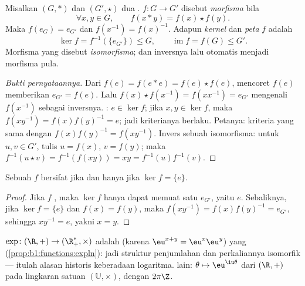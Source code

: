 \begin{definition}\label{def:b1:structures:morphism}
Misalkan $(G, *)$ dan $(G', \star)$ dua .  $f \colon G \to G'$
disebut \emph{morfisma} bila
\[
\forall x, y \in G, \qquad f(x * y) = f(x) \star f(y).
\]
Maka $f(e_G) = e_{G'}$ dan $f(x^{-1}) = f(x)^{-1}$. Adapun
\emph{kernel} dan \emph{peta} $f$ adalah
\[
\ker f = f^{-1}(\{e_{G'}\}) \leq G,
\qquad
\operatorname{im} f = f(G) \leq G' .
\]
Morfisma yang  disebut \emph{isomorfisma}; dan  inversnya lalu
otomatis menjadi morfisma pula.
\end{definition}

\begin{proof}[Bukti pernyataannya]
Dari $f(e) = f(e * e) = f(e)\star f(e)$, mencoret $f(e)$ memberikan
$e_{G'} = f(e)$. Lalu $f(x)\star f(x^{-1}) = f(x x^{-1}) = e_{G'}$
mengenali $f(x^{-1})$ sebagai inversnya. : $e \in \ker f$; jika
$x, y \in \ker f$, maka $f(xy^{-1}) = f(x)f(y)^{-1} = e$; jadi kriterianya
berlaku. Petanya: kriteria yang sama dengan $f(x)f(y)^{-1} = f(xy^{-1})$.
Invers sebuah isomorfisma: untuk $u, v \in G'$, tulis $u = f(x)$, $v =
f(y)$; maka $f^{-1}(u \star v) = f^{-1}(f(xy)) = xy =
f^{-1}(u) f^{-1}(v)$.
\end{proof}

\begin{proposition}\label{prop:b1:structures:kernel}
Sebuah   $f$ bersifat  jika dan hanya jika $\ker f =
\{e\}$.
\end{proposition}

\begin{proof}
Jika $f$ , maka $\ker f$ hanya dapat memuat satu 
$e_{G'}$, yaitu $e$. Sebaliknya, jika $\ker f = \{e\}$ dan $f(x) =
f(y)$, maka $f(xy^{-1}) = f(x) f(y)^{-1} = e_{G'}$, sehingga $xy^{-1} = e$,
yakni $x = y$.
\end{proof}

\begin{example}\label{ex:b1:structures:expmorphism}
$\exp \colon (\R, +) \to (\R_+^*, \times)$ adalah 
(karena $\eu^{x+y} = \eu^x \eu^y$) yang 
(\cref{prop:b1:functions:expln}): jadi struktur penjumlahan dan
perkaliannya isomorfik --- itulah alasan historis keberadaan
logaritma.  lain: $\theta \mapsto \eu^{\iu\theta}$ dari
$(\R, +)$ pada lingkaran satuan $(\mathbb{U}, \times)$, dengan 
$2\pi\Z$.
\end{example}

